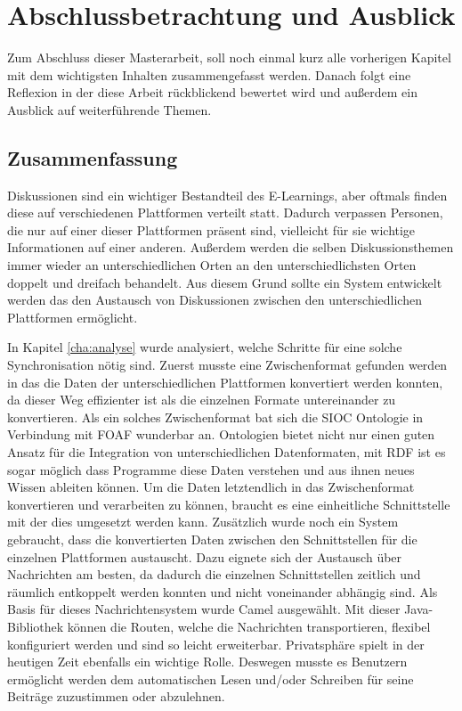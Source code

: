 
\chapter{Abschlussbetrachtung und Ausblick} %
\label{cha:zusammenfassung_und_ausblick}

Zum Abschluss dieser Masterarbeit, soll noch einmal kurz alle vorherigen Kapitel mit dem wichtigsten Inhalten zusammengefasst werden. Danach folgt eine Reflexion in der diese Arbeit rückblickend bewertet wird und außerdem ein Ausblick auf weiterführende Themen. 

\section{Zusammenfassung} %
\label{sec:zusammenfassung} 

Diskussionen sind ein wichtiger Bestandteil des E-Learnings, aber oftmals finden diese auf verschiedenen Plattformen verteilt statt. Dadurch verpassen Personen, die nur auf einer dieser Plattformen präsent sind, vielleicht für sie wichtige Informationen auf einer anderen. Außerdem werden die selben Diskussionsthemen immer wieder an unterschiedlichen Orten an den unterschiedlichsten Orten doppelt und dreifach behandelt. Aus diesem Grund sollte ein System entwickelt werden das den Austausch von Diskussionen zwischen den unterschiedlichen Plattformen ermöglicht. 

In Kapitel \ref{cha:analyse} wurde analysiert, welche Schritte für eine solche Synchronisation nötig sind. Zuerst musste eine Zwischenformat gefunden werden in das die Daten der unterschiedlichen Plattformen konvertiert werden konnten, da dieser Weg effizienter ist als die einzelnen Formate untereinander zu konvertieren. Als ein solches Zwischenformat bat sich die SIOC Ontologie in Verbindung mit FOAF wunderbar an. Ontologien bietet nicht nur einen guten Ansatz für die Integration von unterschiedlichen Datenformaten, mit RDF ist es sogar möglich dass Programme diese Daten verstehen und aus ihnen neues Wissen ableiten können. Um die Daten letztendlich in das Zwischenformat konvertieren und verarbeiten zu können, braucht es eine einheitliche Schnittstelle mit der dies umgesetzt werden kann. Zusätzlich wurde noch ein System gebraucht, dass die konvertierten Daten zwischen den Schnittstellen für die einzelnen Plattformen austauscht. Dazu eignete sich der Austausch über Nachrichten am besten, da dadurch die einzelnen Schnittstellen zeitlich und räumlich entkoppelt werden konnten und nicht voneinander abhängig sind. Als Basis für dieses Nachrichtensystem wurde Camel ausgewählt. Mit dieser Java-Bibliothek können die Routen, welche die Nachrichten transportieren, flexibel konfiguriert werden und sind so leicht erweiterbar. Privatsphäre spielt in der heutigen Zeit ebenfalls ein wichtige Rolle. Deswegen musste es Benutzern ermöglicht werden dem automatischen Lesen und/oder Schreiben für seine Beiträge zuzustimmen oder abzulehnen.

